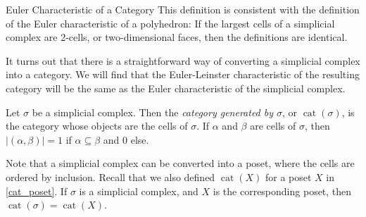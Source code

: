 \documentclass[12pt]{pom_thesis}
\DeclareMathOperator{\cat}{cat}
\begin{document}
\begin{chapter}{Euler Characteristic of a Category}
This definition is consistent with the definition of the Euler characteristic of a polyhedron: If the largest cells of a simplicial complex are 2-cells, or two-dimensional faces, then the definitions are identical. 

It turns out that there is a straightforward way of converting a simplicial complex into a category. We will find that the Euler-Leinster characteristic of the resulting category will be the same as the Euler characteristic of the simplicial complex. 
\begin{defn}
Let $\sigma$ be a simplicial complex. Then the \emph{category generated by $\sigma$}, or $\cat(\sigma)$, is the category whose objects are the cells of $\sigma$. If $\alpha$ and $\beta$ are cells of $\sigma$, then $|(\alpha, \beta)| = 1$ if $\alpha \subseteq \beta$ and 0 else.
\end{defn}
Note that a simplicial complex can be converted into a poset, where the cells are ordered by inclusion. Recall that we also defined $\cat(X)$ for a poset $X$ in \ref{cat_poset}. If $\sigma$ is a simplicial complex, and $X$ is the corresponding poset, then $\cat(\sigma) = \cat(X)$.


\end{chapter}
\end{document}

